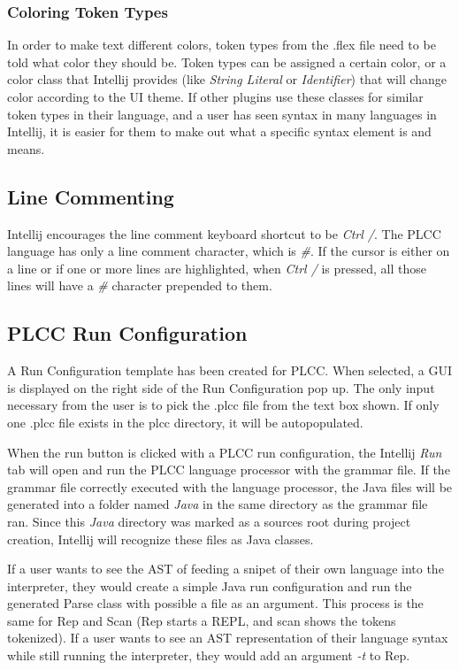 \documentclass[conference, letterpaper]{IEEEtran}
\begin{document}
\subsubsection{Coloring Token Types}\label{subsubsec:coloring-token-types}
In order to make text different colors, token types from the .flex file need to be told what color they should be.
Token types can be assigned a certain color, or a color class that Intellij provides (like \textit{String Literal} or \textit{Identifier}) that will change color according to the UI theme.
If other plugins use these classes for similar token types in their language, and a user has seen syntax in many languages in Intellij, it is easier for them to make out what a specific syntax element is and means.

\subsection{Line Commenting}\label{subsec:line-commenting}
Intellij encourages the line comment keyboard shortcut to be \textit{Ctrl /}.
The PLCC language has only a line comment character, which is \textit{\#}.
If the cursor is either on a line or if one or more lines are highlighted, when \textit{Ctrl /} is pressed, all those lines will have a \textit{\#} character prepended to them.


\subsection{PLCC Run Configuration}\label{subsec:plcc-run-configuration}
A Run Configuration template has been created for PLCC\@.
When selected, a GUI is displayed on the right side of the Run Configuration pop up.
The only input necessary from the user is to pick the .plcc file from the text box shown.
If only one .plcc file exists in the plcc directory, it will be autopopulated.

When the run button is clicked with a PLCC run configuration, the Intellij \textit{Run} tab will open and run the PLCC language processor with the grammar file.
If the grammar file correctly executed with the language processor, the Java files will be generated into a folder named \textit{Java} in the same directory as the grammar file ran.
Since this \textit{Java} directory was marked as a sources root during project creation, Intellij will recognize these files as Java classes.

If a user wants to see the AST of feeding a snipet of their own language into the interpreter, they would create a simple Java run configuration and run the generated Parse class with possible a file as an argument.
This process is the same for Rep and Scan (Rep starts a REPL, and scan shows the tokens tokenized).
If a user wants to see an AST representation of their language syntax while still running the interpreter, they would add an argument \textit{-t} to Rep.
\end{document}
